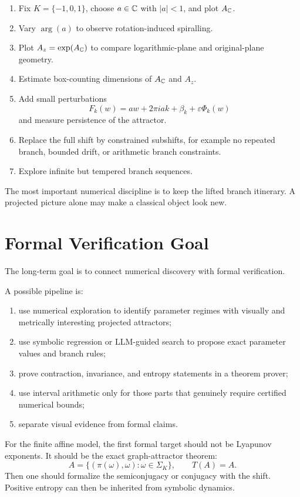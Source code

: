 	\begin{enumerate}
		\item Fix \(K=\{-1,0,1\}\), choose \(a\in\mathbb{C}\) with \(|a|<1\), and plot \(A_{\mathbb{C}}\).
		\item Vary \(\arg(a)\) to observe rotation-induced spiralling.
		\item Plot \(A_z=\exp(A_{\mathbb{C}})\) to compare logarithmic-plane and original-plane geometry.
		\item Estimate box-counting dimensions of \(A_{\mathbb{C}}\) and \(A_z\).
		\item Add small perturbations
		\[
		F_k(w)=a w+2\pi i a k+\beta_k+\varepsilon\Phi_k(w)
		\]
		and measure persistence of the attractor.
		\item Replace the full shift by constrained subshifts, for example no repeated branch, bounded drift, or arithmetic branch constraints.
		\item Explore infinite but tempered branch sequences.
	\end{enumerate}
	
	The most important numerical discipline is to keep the lifted branch itinerary. A projected picture alone may make a classical object look new.
	
	\section{Formal Verification Goal}
	
	The long-term goal is to connect numerical discovery with formal verification.
	
	A possible pipeline is:
	
	\begin{enumerate}
		\item use numerical exploration to identify parameter regimes with visually and metrically interesting projected attractors;
		\item use symbolic regression or LLM-guided search to propose exact parameter values and branch rules;
		\item prove contraction, invariance, and entropy statements in a theorem prover;
		\item use interval arithmetic only for those parts that genuinely require certified numerical bounds;
		\item separate visual evidence from formal claims.
	\end{enumerate}
	
	For the finite affine model, the first formal target should not be Lyapunov exponents. It should be the exact graph-attractor theorem:
	\[
	A=\{(\pi(\omega),\omega):\omega\in\Sigma_K\},
	\qquad
	T(A)=A.
	\]
	Then one should formalize the semiconjugacy or conjugacy with the shift. Positive entropy can then be inherited from symbolic dynamics.
	
